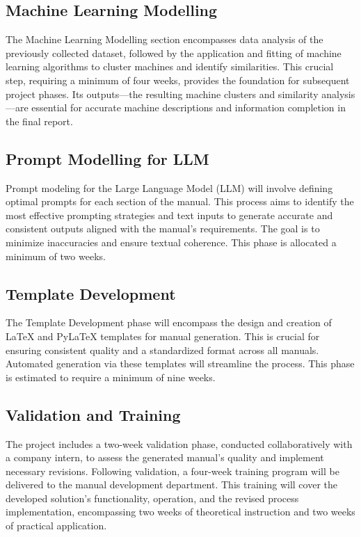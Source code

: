 \documentclass{article}%
\begin{document}
%
\subsection{Machine Learning Modelling}%
\label{subsec:MachineLearningModelling}%
The Machine Learning Modelling section encompasses data analysis of the previously collected dataset, followed by the application and fitting of machine learning algorithms to cluster machines and identify similarities.  This crucial step, requiring a minimum of four weeks, provides the foundation for subsequent project phases.  Its outputs—the resulting machine clusters and similarity analysis—are essential for accurate machine descriptions and information completion in the final report.

%
\subsection{Prompt Modelling for LLM}%
\label{subsec:PromptModellingforLLM}%
Prompt modeling for the Large Language Model (LLM) will involve defining optimal prompts for each section of the manual. This process aims to identify the most effective prompting strategies and text inputs to generate accurate and consistent outputs aligned with the manual's requirements.  The goal is to minimize inaccuracies and ensure textual coherence. This phase is allocated a minimum of two weeks.

%
\subsection{Template Development}%
\label{subsec:TemplateDevelopment}%
The Template Development phase will encompass the design and creation of LaTeX and PyLaTeX templates for manual generation.  This is crucial for ensuring consistent quality and a standardized format across all manuals.  Automated generation via these templates will streamline the process. This phase is estimated to require a minimum of nine weeks.

%
\subsection{Validation and Training}%
\label{subsec:ValidationandTraining}%
The project includes a two{-}week validation phase, conducted collaboratively with a company intern, to assess the generated manual's quality and implement necessary revisions.  Following validation, a four{-}week training program will be delivered to the manual development department. This training will cover the developed solution's functionality, operation, and the revised process implementation, encompassing two weeks of theoretical instruction and two weeks of practical application.
\end{document}
